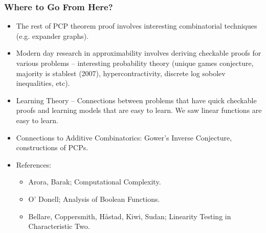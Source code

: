 \documentclass{beamer}
\begin{document}
\begin{frame}
    \frametitle{Where to Go From Here?}

    \begin{itemize}
        \item<1-> The rest of PCP theorem proof involves interesting combinatorial techniques (e.g. expander graphs).

        \item<2-> Modern day research in approximability involves deriving checkable proofs for various problems -- interesting probability theory (unique games conjecture, majority is stablest (2007), hypercontractivity, discrete log sobolev inequalities, etc).

        \item<3-> Learning Theory -- Connections between problems that have quick checkable proofs and learning models that are easy to learn. We saw linear functions are easy to learn.

        \item<4-> Connections to Additive Combinatorics: Gower's Inverse Conjecture, constructions of PCPs.

        \item<5-> References:
        \begin{itemize}
            \item Arora, Barak; Computational Complexity.
            \item O' Donell; Analysis of Boolean Functions.
            \item Bellare, Coppersmith, H\r{a}stad, Kiwi, Sudan; Linearity Testing in Characteristic Two.
        \end{itemize}
    \end{itemize}
\end{frame}
\end{document}
